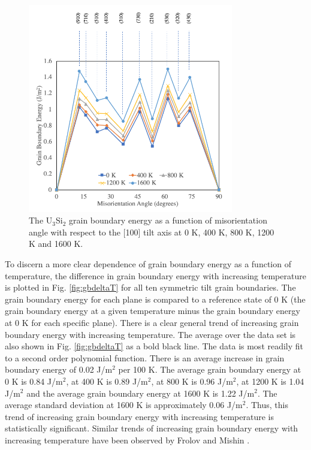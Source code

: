 \documentclass[review]{elsarticle}
\begin{document}
\begin{figure}[h]
 \centering
 \includegraphics[width=0.8\textwidth]{gb_vs_T.png} 
 \caption{The U$_{3}$Si$_{2}$ grain boundary energy as a function of misorientation angle with respect to the [100] tilt axis at 0 K, 400 K, 800 K, 1200 K and 1600 K.}
 \label{fig:gbtemp}
\end{figure}

\FloatBarrier

To discern a more clear dependence of grain boundary energy as a function of temperature, the difference in grain boundary energy with increasing temperature is plotted in Fig. \ref{fig:gbdeltaT} for all ten symmetric tilt grain boundaries. The grain boundary energy for each plane is compared to a reference state of 0 K (the grain boundary energy at a given temperature minus the grain boundary energy at 0 K for each specific plane). There is a clear general trend of increasing grain boundary energy with increasing temperature. The average over the data set is also shown in Fig. \ref{fig:gbdeltaT} as a bold black line. The data is most readily fit to a second order polynomial function. There is an average increase in grain boundary energy of 0.02 J/m$^{2}$ per 100 K. The average grain boundary energy at 0 K is 0.84 J/m$^{2}$, at 400 K is 0.89 J/m$^{2}$, at 800 K is 0.96 J/m$^{2}$, at 1200 K is 1.04 J/m$^{2}$ and the average grain boundary energy at 1600 K is 1.22 J/m$^{2}$. The average standard deviation at 1600 K is approximately 0.06 J/m$^{2}$. Thus, this trend of increasing grain boundary energy with increasing temperature is statistically significant. Similar trends of increasing grain boundary energy with increasing temperature have been observed by Frolov and Mishin \cite{frolov2012}. 
\end{document}
